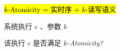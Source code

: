 \begin{frame}{}
  \begin{center}
    \hl{\large $k$-Atomicity = 实时序 + $k$-读写语义} \\[5pt]
    
     
  \end{center}

  \vspace{0.20cm}
  \begin{center}
    \resizebox{0.75\textwidth}{!}{}
  \end{center}

\end{frame}

\begin{frame}{}
  \begin{cdef}
    \vspace{8pt}
    \begin{description}
      \setlength{\itemsep}{8pt}
      \item[实例:] 系统执行 $e$ 、参数 $k$
      \item[问题:] 该执行 $e$ 是否满足 $k$\emph{-Atomicity?}
    \end{description}
  \end{cdef}
\end{frame}

